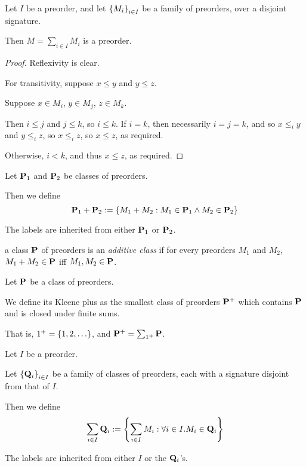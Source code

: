 \begin{lemma}
  Let $I$ be a preorder, and let $\left\{ {M_i} \right\}_{i \in I}$ be a family of preorders,
  over a disjoint signature.

  Then $M = \sum_{i \in I} M_i$ is a preorder.
\end{lemma}

\begin{proof}
  Reflexivity is clear.

  For transitivity, suppose $x \le y$ and $y \le z$.

  Suppose $x \in M_i$, $y \in M_j$, $z \in M_k$.

  Then $i \le j$ and $j \le k$, so $i \le k$.
  If $i = k$, then necessarily $i = j = k$, and so $x \le_i y$ and $y \le_i z$,
  so $x \le_i z$, so $x \le z$, as required.

  Otherwise, $i < k$, and thus $x \le z$, as required.
\end{proof}

\begin{definition}
  Let $\mathbf{P}_1$ and $\mathbf{P}_2$ be classes of preorders.

  Then we define
  \[
    \mathbf{P}_1 + \mathbf{P}_2 := \left\{ {M_1 + M_2 : M_1 \in \mathbf{P}_1 \wedge M_2 \in \mathbf{P}_2} \right\}
  \]

  The labels are inherited from either $\mathbf{P}_1$ or $\mathbf{P}_2$.
\end{definition}

\begin{definition}
  a class $\mathbf{P}$ of preorders is an \emph{additive class} if for every preorders $M_1$ and $M_2$,
  $M_1 + M_2 \in \mathbf{P}$ iff $M_1, M_2 \in \mathbf{P}$.
\end{definition}

\begin{definition}
  Let $\mathbf{P}$ be a class of preorders.

  We define its Kleene plus as the smallest class of preorders $\mathbf{P}^+$ which contains $\mathbf{P}$ and is closed under
  finite sums.

  That is, $1^+ = \left\{ {1, 2, \ldots} \right\}$, and $\mathbf{P}^+ = \sum_{1^+}{\mathbf{P}}$.
\end{definition}

\begin{definition}
  Let $I$ be a preorder.

  Let $\left\{ {\mathbf{Q}_i} \right\}_{i \in I}$ be a family of classes of preorders,
  each with a signature disjoint from that of $I$.

  Then we define
  \[
    \sum_{i \in I}{\mathbf{Q}_i} := \left\{ {\sum_{i \in I}{M_i} : \forall i \in I. M_i \in \mathbf{Q}_i} \right\}
  \]

  The labels are inherited from either $I$ or the $\mathbf{Q}_i$'s.
\end{definition}


